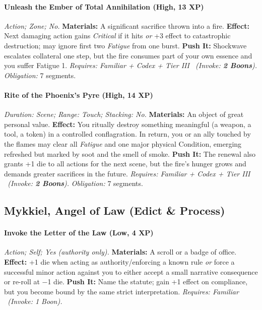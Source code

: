 \paragraph{Unleash the Ember of Total Annihilation (High, 13 XP)} \emph{Action; Zone; No.}
\textbf{Materials:} A significant sacrifice thrown into a fire.
\textbf{Effect:} Next damaging action gains \emph{Critical} if it hits \emph{or} +3 effect to catastrophic destruction; may ignore first two \emph{Fatigue} from one burst.
\textbf{Push It:} Shockwave escalates collateral one step, but the fire consumes part of your own essence and you suffer Fatigue 1.
\emph{Requires: Familiar + Codex + Tier III \ (\textit{Invoke:} \textbf{2 Boons}).}
\emph{Obligation:} 7 segments.

\paragraph{Rite of the Phoenix's Pyre (High, 14 XP)} \emph{Duration: Scene; Range: Touch; Stacking: No.}
\textbf{Materials:} An object of great personal value.
\textbf{Effect:} You ritually destroy something meaningful (a weapon, a tool, a token) in a controlled conflagration. In return, you or an ally touched by the flames may clear all \emph{Fatigue} and one major physical Condition, emerging refreshed but marked by soot and the smell of smoke.
\textbf{Push It:} The renewal also grants +1 die to all actions for the next scene, but the fire's hunger grows and demands greater sacrifices in the future.
\emph{Requires: Familiar + Codex + Tier III \ (\textit{Invoke:} \textbf{2 Boons}).}
\emph{Obligation:} 7 segments.

\subsection{Mykkiel, Angel of Law (Edict \& Process)}
\paragraph{Invoke the Letter of the Law (Low, 4 XP)} \emph{Action; Self; Yes (authority only).}
\textbf{Materials:} A scroll or a badge of office.
\textbf{Effect:} +1 die when acting as authority/enforcing a known rule \emph{or} force a successful minor action against you to either accept a small narrative consequence or re-roll at −1 die.
\textbf{Push It:} Name the statute; gain +1 effect on compliance, but you become bound by the same strict interpretation.
\emph{Requires: Familiar \ (\textit{Invoke:} 1 Boon).}
